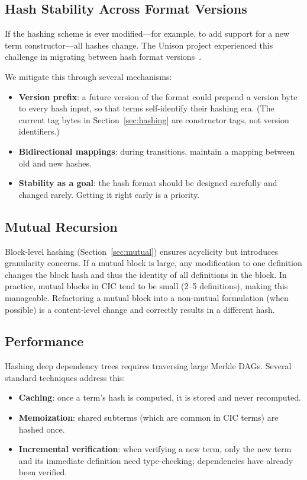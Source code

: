 \documentclass[11pt]{article}
\theoremstyle{definition}
\theoremstyle{plain}
\theoremstyle{remark}
\begin{document}
\subsection{Hash Stability Across Format Versions}
\label{sec:hash-stability}

If the hashing scheme is ever modified---for example, to add support for a new term
constructor---all hashes change.
The Unison project experienced this challenge in migrating between hash format versions~\cite{unison}.

We mitigate this through several mechanisms:
\begin{itemize}[nosep]
  \item \textbf{Version prefix}: a future version of the format could prepend a version byte to
    every hash input, so that terms self-identify their hashing era.
    (The current tag bytes in Section~\ref{sec:hashing} are constructor tags, not version identifiers.)
  \item \textbf{Bidirectional mappings}: during transitions, maintain a mapping between old and new hashes.
  \item \textbf{Stability as a goal}: the hash format should be designed carefully and changed rarely.
    Getting it right early is a priority.
\end{itemize}

\subsection{Mutual Recursion}
\label{sec:mutual-challenges}

Block-level hashing (Section~\ref{sec:mutual}) ensures acyclicity but introduces granularity
concerns.
If a mutual block is large, any modification to one definition changes the block hash and
thus the identity of all definitions in the block.
In practice, mutual blocks in CIC tend to be small (2--5 definitions), making this manageable.
Refactoring a mutual block into a non-mutual formulation (when possible) is a content-level
change and correctly results in a different hash.

\subsection{Performance}
\label{sec:performance}

Hashing deep dependency trees requires traversing large Merkle DAGs.
Several standard techniques address this:
\begin{itemize}[nosep]
  \item \textbf{Caching}: once a term's hash is computed, it is stored and never recomputed.
  \item \textbf{Memoization}: shared subterms (which are common in CIC terms) are hashed once.
  \item \textbf{Incremental verification}: when verifying a new term, only the new term and its
    immediate definition need type-checking; dependencies have already been verified.
\end{itemize}
\end{document}

